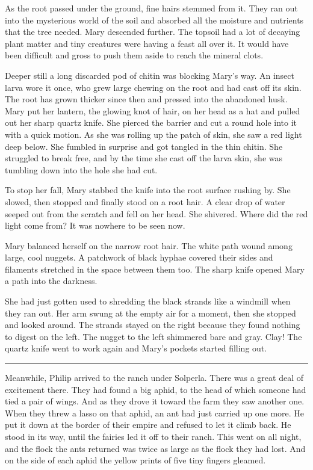 \documentclass[10pt, draft]{memoir}
\renewcommand{\pfbreakdisplay}{\bigskip \ding{166} \bigskip}
\newcommand{\secbreak}{\fancybreak{\pfbreakdisplay}}
\begin{document}
As the root passed under the ground, fine hairs stemmed from it. They ran out
into the mysterious world of the soil and absorbed all the moisture and
nutrients that the tree needed. Mary descended further. The topsoil had a lot
of decaying plant matter and tiny creatures were having a feast all over it. It
would have been difficult and gross to push them aside to reach the mineral
clots.

Deeper still a long discarded pod of chitin was blocking Mary's way. An insect
larva wore it once, who grew large chewing on the root and had cast off its
skin. The root has grown thicker since then and pressed into the abandoned
husk. Mary put her lantern, the glowing knot of hair, on her head as a hat and
pulled out her sharp quartz knife. She pierced the barrier and cut a round hole
into it with a quick motion. As she was rolling up the patch of skin, she saw a
red light deep below. She fumbled in surprise and got tangled in the thin
chitin. She struggled to break free, and by the time she cast off the larva
skin, she was tumbling down into the hole she had cut.

To stop her fall, Mary stabbed the knife into the root surface rushing by. She
slowed, then stopped and finally stood on a root hair. A clear drop of water
seeped out from the scratch and fell on her head. She shivered. Where did the
red light come from? It was nowhere to be seen now.

Mary balanced herself on the narrow root hair. The white path wound among
large, cool nuggets. A patchwork of black hyphae covered their sides and
filaments stretched in the space between them too. The sharp knife opened Mary
a path into the darkness.

She had just gotten used to shredding the black strands like a windmill when
they ran out. Her arm swung at the empty air for a moment, then she stopped and
looked around. The strands stayed on the right because they found nothing to
digest on the left. The nugget to the left shimmered bare and gray. Clay! The
quartz knife went to work again and Mary's pockets started filling out.

\secbreak

Meanwhile, Philip arrived to the ranch under Solperla. There was a great deal
of excitement there. They had found a big aphid, to the head of which someone
had tied a pair of wings. And as they drove it toward the farm they saw another
one. When they threw a lasso on that aphid, an ant had just carried up one
more. He put it down at the border of their empire and refused to let it climb
back. He stood in its way, until the fairies led it off to their ranch. This
went on all night, and the flock the ants returned was twice as large as the
flock they had lost. And on the side of each aphid the yellow prints of five
tiny fingers gleamed.
\end{document}
